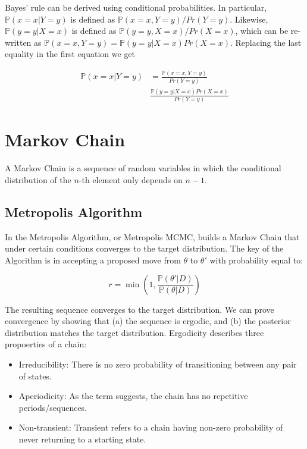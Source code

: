 \documentclass[
]{book}
\begin{document}
Bayes' rule can be derived using conditional probabilities. In particular, \(\mathbb{P}{\left(x=x|Y=y\right)}\) is defined as \(\mathbb{P}{\left(x=x, Y=y\right)}/Pr{\left(Y=y\right)}\). Likewise, \(\mathbb{P}{\left(y=y|X=x\right)}\) is defined as \(\mathbb{P}{\left(y=y, X=x\right)}/Pr{\left(X=x\right)}\), which can be re-written as \(\mathbb{P}{\left(x=x, Y=y\right)} = \mathbb{P}{\left(y=y|X=x\right)}Pr{\left(X=x\right)}\). Replacing the last equality in the first equation we get

\begin{align*}
\mathbb{P}{\left(x=x|Y=y\right)} & = \frac{\mathbb{P}{\left(x=x, Y=y\right)}}{Pr{\left(Y=y\right)}} \\
& \frac{\mathbb{P}{\left(y=y|X=x\right)}Pr{\left(X=x\right)}}{Pr{\left(Y=y\right)}}
\end{align*}

\hypertarget{markov-chain}{%
\chapter{Markov Chain}\label{markov-chain}}

A Markov Chain is a sequence of random variables in which the conditional distribution of the \(n\)-th element only depends on \(n-1\).

\hypertarget{metropolis-algorithm}{%
\section{Metropolis Algorithm}\label{metropolis-algorithm}}

In the Metropolis Algorithm, or Metropolis MCMC, builds a Markov Chain that
under certain conditions converges to the target distribution. The key of the
Algorithm is in accepting a proposed move from \(\theta\) to \(\theta'\) with
probability equal to:

\begin{equation}
r = \min\left(1, \frac{\mathbb{P}{\left(\theta'|D\right)}}{\mathbb{P}{\left(\theta|D\right)}}\right)
\end{equation}

The resulting sequence converges to the target distribution. We can prove
convergence by showing that (a) the sequence is ergodic, and (b) the posterior
distribution matches the target distribution. Ergodicity describes three
propoerties of a chain:

\begin{itemize}
\item
  Irreducibility: There is no zero probability of transitioning between any pair of states.
\item
  Aperiodicity: As the term suggests, the chain has no repetitive periods/sequences.
\item
  Non-transient: Transient refers to a chain having non-zero probability of
  never returning to a starting state.
\end{itemize}
\end{document}
